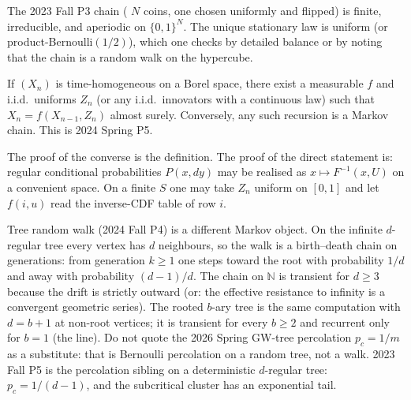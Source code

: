 The 2023 Fall P3 chain ( \(N\) coins, one chosen uniformly and flipped) is finite, irreducible, and aperiodic on \(\{0,1\}^{N}\). The unique stationary law is uniform (or product-Bernoulli\((1/2)\)), which one checks by detailed balance or by noting that the chain is a random walk on the hypercube.

\begin{theorem}[Representation]
\label{thm:mc-rep}
If \((X_{n})\) is time-homogeneous on a Borel space, there exist a measurable \(f\) and i.i.d.\ uniforms \(Z_{n}\) (or any i.i.d.\ innovators with a continuous law) such that \(X_{n}=f(X_{n-1},Z_{n})\) almost surely. Conversely, any such recursion is a Markov chain. This is 2024 Spring P5.
\end{theorem}

The proof of the converse is the definition. The proof of the direct statement is: regular conditional probabilities \(P(x,dy)\) may be realised as \(x\mapsto F^{-1}(x,U)\) on a convenient space. On a finite \(S\) one may take \(Z_{n}\) uniform on \([0,1]\) and let \(f(i,u)\) read the inverse-CDF table of row \(i\).

Tree random walk (2024 Fall P4) is a different Markov object. On the infinite \(d\)-regular tree every vertex has \(d\) neighbours, so the walk is a birth--death chain on generations: from generation \(k\ge 1\) one steps toward the root with probability \(1/d\) and away with probability \((d-1)/d\). The chain on \(\mathbb{N}\) is transient for \(d\ge 3\) because the drift is strictly outward (or: the effective resistance to infinity is a convergent geometric series). The rooted \(b\)-ary tree is the same computation with \(d=b+1\) at non-root vertices; it is transient for every \(b\ge 2\) and recurrent only for \(b=1\) (the line). Do not quote the 2026 Spring GW-tree percolation \(p_{c}=1/m\) as a substitute: that is Bernoulli percolation on a random tree, not a walk. 2023 Fall P5 is the percolation sibling on a deterministic \(d\)-regular tree: \(p_{c}=1/(d-1)\), and the subcritical cluster has an exponential tail.

